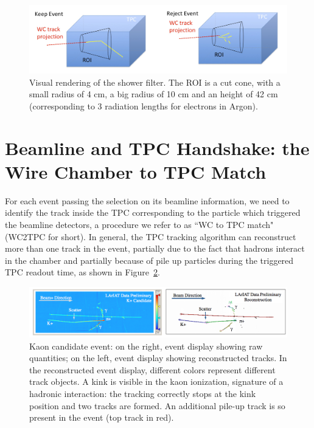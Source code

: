 \begin{figure}
  \centering  
\includegraphics[width=\textwidth]{Chapter-4/Images/Shower.png}
\caption{Visual rendering of the shower filter. The ROI is a cut cone, with a small radius of 4 cm, a big radius of 10 cm and an height of 42 cm (corresponding to 3 radiation lengths for electrons in Argon).}
\label{fig:showerFilt}
\end{figure}



\section{Beamline and TPC Handshake: the Wire Chamber to TPC Match}\label{ch:WC2TPCMatchMethod}
For each event passing the selection on its beamline information, we need to identify the track inside the TPC corresponding to the particle which triggered the beamline detectors, a procedure we refer to as ``WC to TPC match" (WC2TPC for short). In general, the TPC tracking algorithm can reconstruct more than one track in the event, partially due to the fact that hadrons interact in the chamber and partially because of pile up particles during the triggered TPC readout time, as shown in Figure~\ref{fig:kaonInteraction}. 


\begin{figure}
  \centering  
\includegraphics[width=\textwidth]{Chapter-4/Images/KaonExample.png}
\caption{Kaon candidate event: on the right, event display showing raw quantities; on the left, event display showing reconstructed tracks. In the reconstructed event display, different colors represent different track objects. A kink is visible in the kaon ionization, signature of a hadronic interaction: the tracking correctly stops at the kink position and two tracks are formed. An additional pile-up track is so present in the event (top track in red).}
\label{fig:kaonInteraction}
\end{figure}



